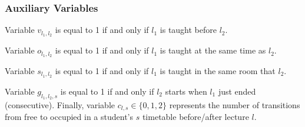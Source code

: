 \subsubsection{Auxiliary Variables} Variable $v_{l_1,l_2}$ is equal to 1 if and only if $l_1$ is taught before $l_2$. 
\begin{comment}
v_{l_1,l_2}= \begin{cases}
  1 & \textrm{if} \ a^{l_1} + len_{l_1} \leq a^{l_2}\\
  0 & \textrm{otherwise}  \end{cases}  \forall_{l_1\in L, l_2\in L}.  
\end{comment}
Variable $o_{l_1,l_2}$ is equal to 1 if and only if $l_1$ is taught at the same time as $l_2$.
\begin{comment}
o_{l_1,l_2}= \begin{cases}
  1 & \textrm{if} \  v_{l_1,l_2} + v_{l_2,l_1} = 0\\
  0 & \textrm{otherwise}  \end{cases}  \forall_{l_1\in L, l_2\in L}.  
\end{comment}
Variable $s_{l_1,l_2}$ is equal to 1 if and only if $l_1$ is taught in the same room that $l_2$. 
\begin{comment}
s_{l_1,l_2}= \begin{cases}
  1 & \textrm{if} \ x_{l_1,r} = x_{l_2,r}\\
  0 & \textrm{otherwise}  \end{cases}   \forall_{l_1\in L, l_2\in L, r \in R}.
\end{comment}
Variable $g_{l_1,l_2,s}$ is equal to 1 if and only if $l_2$ starts when $l_1$ just ended (consecutive). Finally, variable $c_{l,s} \in \{0,1,2\}$ represents the number of transitions from free to occupied in a student's $s$ timetable before/after lecture $l$. 
\begin{comment}
g_{l_1,l_2,s}= \begin{cases}
  1 & \textrm{if} \  a^{l_1} + len_{l_1} = a^{l_2}\\
  0 & \textrm{otherwise}  \end{cases}  \forall_{l_1\in S_l, l_2\in S_l, s\in S}.  
\end{comment}
\begin{comment}
c_{l,s}= \begin{cases}
  1 & \textrm{if} \  \sum_{l_2 \in S_l}v_{l,l_2} + \sum_{l_2 \in S_l} v_{l_2,l}\\
  0 & \textrm{otherwise}  \end{cases}  \forall_{l\in S_l, s\in S}.  
\end{comment}


